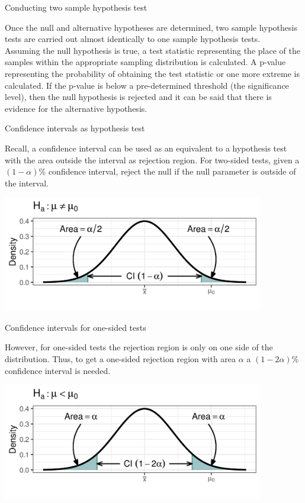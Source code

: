 \documentclass[xcolor=table, aspectratio=169, bigger, handout]{beamer}
\begin{document}
\begin{frame}{Conducting two sample hypothesis test}
\begin{block}{}
Once the null and alternative hypotheses are determined, two sample hypothesis tests are carried out almost identically to one sample hypothesis tests.\\
\medskip
Assuming the null hypothesis is true, a test statistic representing the place of the samples within the appropriate sampling distribution is calculated. A p-value representing the probability of obtaining the test statistic or one more extreme is calculated. If the p-value is below a pre-determined threshold (the significance level), then the null hypothesis is rejected and it can be said that there is evidence for the alternative hypothesis.
\end{block}
\end{frame}

\begin{frame}{Confidence intervals as hypothesis test}
\begin{block}{}
Recall, a confidence interval can be used as an equivalent to a hypothesis test with the area outside the interval as rejection region. For two-sided tests, given a $(1-\alpha)$\% confidence interval, reject the null if the null parameter is outside of the interval.  
\end{block}
\medskip
{\centering
\includegraphics[width=4.5in]{../images/wk09_two_ci}
\par}
\end{frame}

\begin{frame}{Confidence intervals for one-sided tests}
\begin{block}{}
However, for one-sided tests the rejection region is only on one side of the distribution. Thus, to get a one-sided rejection region with area $\alpha$ a $(1-2\alpha)$\% confidence interval is needed.
\end{block}
\medskip
{\centering
\includegraphics[width=4.5in]{../images/wk09_one_ci}
\par}
\end{frame}
\end{document}
